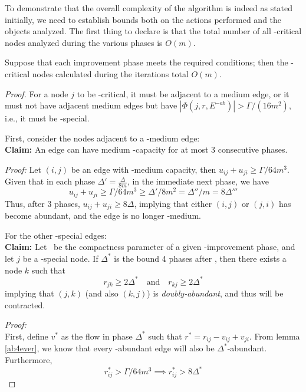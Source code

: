 To demonstrate that the overall complexity of the algorithm is indeed as stated initially, we need to establish bounds both on the actions performed and the objects analyzed. The first thing to declare is that the total number of all \gmm-critical nodes analyzed during the various phases is \( O(m) \).

\begin{theorem}
    \label{maxM}
    Suppose that each improvement phase meets the required conditions; then the \gmm-critical nodes calculated during the iterations total \( O(m) \).
\end{theorem}

\begin{proof}
    For a node \( j \) to be \gmm-critical, it must be adjacent to a \gmm medium edge, or it must not have adjacent \gmm medium edges but have \( |\Phi (j, r, E^{-ab})| > \Gamma/(16m^2) \), i.e., it must be \gmm-special.

    First, consider the nodes adjacent to a \gmm-medium edge:\\
    \textbf{Claim:}
    An edge can have medium \gmm-capacity for at most 3 consecutive phases.

    \textit{Proof:}
    Let \( (i,j) \) be an edge with \gmm-medium capacity, then \( u_{ij} + u_{ji} \ge \Gamma/64m^3 \). Given that in each phase \( \Delta' = \frac{\Delta}{8m} \), in the immediate next phase, we have 
    \[
    u_{ij} + u_{ji} \ge \Gamma/64m^3 \ge \Delta'/8m^2 = \Delta''/m = 8\Delta'''
    \]
    Thus, after 3 phases, \( u_{ij} + u_{ji} \ge 8\Delta \), implying that either \( (i,j) \) or \( (j,i) \) has become abundant, and the edge is no longer \gmm-medium. \QED

    For the other \gmm-special edges:\\
    \textbf{Claim:}
    Let \gmm\ be the compactness parameter of a given \dlt-improvement phase, and let \( j \) be a \gmm-special node. If \( \Delta^* \) is the bound 4 phases after \dlt, then there exists a node \( k \) such that 
    \[
    r_{jk} \ge 2\Delta^* \quad \text{and} \quad r_{kj} \ge 2\Delta^* 
    \]
    implying that \( (j,k) \) (and also \( (k,j) \)) is \textit{doubly-abundant}, and thus will be contracted.
    
    \textit{Proof:}\\
    First, define \( v^* \) as the flow in phase \( \Delta^* \) such that \( r^* = r_{ij}-v_{ij}+v_{ji} \). From lemma \ref{ab4ever}, we know that every \dlt-abundant edge will also be \( \Delta^* \)-abundant. Furthermore,
    \[
    r_{ij}^* > \Gamma/64m^3 \implies r_{ij}^* > 8\Delta^*
    \]


\end{proof}
